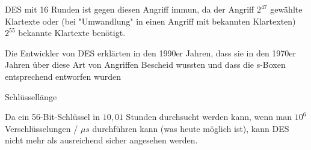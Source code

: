 \documentclass[a4paper]{article}
\begin{document}
\begin{multicols}{3}
\begin{itemize*}
\begin{itemize*}
                  \item DES mit 16 Runden ist gegen diesen Angriff immun, da der Angriff $2^{47}$ gewählte Klartexte oder (bei "Umwandlung" in einen Angriff mit bekannten Klartexten) $2^55$ bekannte Klartexte benötigt.
                  \item Die Entwickler von DES erklärten in den 1990er Jahren, dass sie in den 1970er Jahren über diese Art von Angriffen Bescheid wussten und dass die s-Boxen entsprechend entworfen wurden
            \end{itemize*}
            \item Schlüssellänge
            \begin{itemize*}
                  \item Da ein 56-Bit-Schlüssel in $10,01$ Stunden durchsucht werden kann, wenn man $10^6$ Verschlüsselungen / $\mu s$ durchführen kann (was heute möglich ist), kann DES nicht mehr als ausreichend sicher angesehen werden.
            \end{itemize*}
      \end{itemize*}


\end{multicols}
\end{document}
